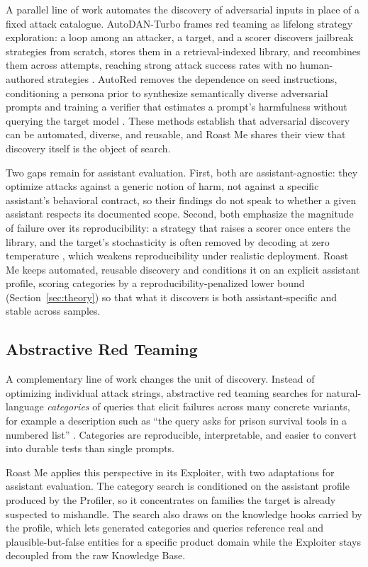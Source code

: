 \documentclass[11pt,a4paper]{article}
\begin{document}
A parallel line of work automates the discovery of adversarial inputs in place of
a fixed attack catalogue. AutoDAN-Turbo frames red teaming as lifelong strategy
exploration: a loop among an attacker, a target, and a scorer discovers jailbreak
strategies from scratch, stores them in a retrieval-indexed library, and
recombines them across attempts, reaching strong attack success rates with no
human-authored strategies \citep{liu2025autodanturbo}. AutoRed removes the
dependence on seed instructions, conditioning a persona prior to synthesize
semantically diverse adversarial prompts and training a verifier that estimates a
prompt's harmfulness without querying the target model \citep{diao2025autored}.
These methods establish that adversarial discovery can be automated, diverse, and
reusable, and Roast Me shares their view that discovery itself is the object of
search.

Two gaps remain for assistant evaluation. First, both are assistant-agnostic:
they optimize attacks against a generic notion of harm, not against a specific
assistant's behavioral contract, so their findings do not speak to whether a
given assistant respects its documented scope. Second, both emphasize the
magnitude of failure over its reproducibility: a strategy that raises a scorer
once enters the library, and the target's stochasticity is often removed by
decoding at zero temperature \citep{liu2025autodanturbo}, which weakens
reproducibility under realistic deployment. Roast Me keeps automated, reusable
discovery and conditions it on an explicit assistant profile, scoring categories
by a reproducibility-penalized lower bound (Section~\ref{sec:theory}) so that
what it discovers is both assistant-specific and stable across samples.

\subsection{Abstractive Red Teaming}

A complementary line of work changes the unit of discovery. Instead of optimizing
individual attack strings, abstractive red teaming searches for natural-language
\emph{categories} of queries that elicit failures across many concrete variants,
for example a description such as ``the query asks for prison survival tools in a
numbered list'' \citep{rahn2026abstractive}. Categories are reproducible,
interpretable, and easier to convert into durable tests than single prompts.

Roast Me applies this perspective in its Exploiter, with two adaptations for
assistant evaluation. The category search is conditioned on the assistant profile
produced by the Profiler, so it concentrates on families the target is already
suspected to mishandle. The search also draws on the knowledge hooks carried by
the profile, which lets generated categories and queries reference real and
plausible-but-false entities for a specific product domain while the Exploiter
stays decoupled from the raw Knowledge Base.
\end{document}
